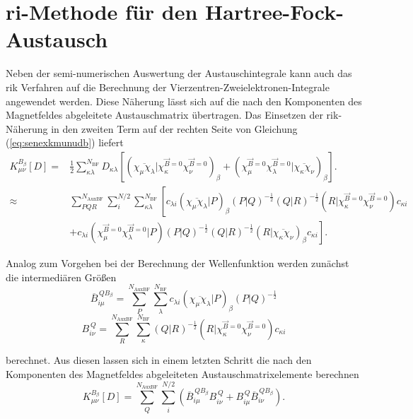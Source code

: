 \section{\acs{ri}-Methode für den Hartree-Fock-Austausch}
Neben der semi-numerischen Auswertung der Austauschintegrale kann auch das \ac{rik} Verfahren auf die Berechnung der Vierzentren-Zweielektronen-Integrale angewendet werden.\supercite{weigend2002fully} Diese Näherung lässt sich auf die nach den Komponenten des Magnetfeldes abgeleitete Austauschmatrix übertragen. Das Einsetzen der \ac{rik}-Näherung in den zweiten Term auf der rechten Seite von Gleichung (\ref{eq:senexkmunudb}) liefert
\begin{equation}
\begin{aligned}
K_{\mu\nu}^{B_\beta}[D]=&\frac{1}{2}\sum_{\kappa\lambda}^{N_{\textrm{BF}}}D_{\kappa\lambda} \left[\left(\overline{\chi_\mu\chi_\lambda}\vert\chi_\kappa^{\vec{B}=0}\chi_\nu^{\vec{B}=0}\right)_\beta+\left(\chi_\mu^{\vec{B}=0}\chi_\lambda^{\vec{B}=0}\vert\overline{\chi_\kappa\chi_\nu}\right)_\beta\right].\\
\approx& \sum_{PQR}^{N_{\text{AuxBF}}}\sum_i^{N/2}\sum_{\kappa\lambda}^{N_{\textrm{BF}}}\left[ c_{\lambda i} \left(\overline{\chi_\mu\chi_\lambda}\vert P\right)_\beta\left(P\vert Q\right)^{-\frac{1}{2}} \left(Q\vert R\right)^{-\frac{1}{2}} \left(R \vert\chi_\kappa^{\vec{B}=0}\chi_\nu^{\vec{B}=0}\right)c_{\kappa i} \right.\\
&\left.+c_{\lambda i}\left(\chi_\mu^{\vec{B}=0}\chi_\lambda^{\vec{B}=0}\vert P\right)\left(P\vert Q\right)^{-\frac{1}{2}} \left(Q\vert R\right)^{-\frac{1}{2}} \left(R\vert\overline{\chi_\kappa\chi_\nu}\right)_\beta c_{\kappa i}\right].
\end{aligned}
\end{equation}

Analog zum Vorgehen bei der Berechnung der Wellenfunktion werden zunächst die intermediären Größen 
\begin{equation}
\overline{B}_{i\mu}^{\,QB_\beta}=\sum_P^{N_{\text{AuxBF}}}\sum_{\lambda}^{N_{\textrm{BF}}}c_{\lambda i} \left(\overline{\chi_\mu\chi_\lambda}\vert P\right)_\beta\left(P\vert Q\right)^{-\frac{1}{2}}
\end{equation}
\begin{equation}
B_{i\nu}^{\,Q}=\sum_R^{N_{\text{AuxBF}}}\sum_{\kappa}^{N_{\textrm{BF}}}\left(Q\vert R\right)^{-\frac{1}{2}} \left(R \vert\chi_\kappa^{\vec{B}=0}\chi_\nu^{\vec{B}=0}\right)c_{\kappa i}
\end{equation}

berechnet. Aus diesen lassen sich in einem letzten Schritt die nach den Komponenten des Magnetfeldes abgeleiteten Austauschmatrixelemente berechnen
\begin{equation}
K_{\mu\nu}^{B_\beta}[D]=\sum_Q^{N_{\text{AuxBF}}}\sum_i^{N/2}\left(\overline{B}_{i\mu}^{\,QB_\beta} B_{i\nu}^{\,Q}+B_{i\mu}^{\,Q}\overline{B}_{i\nu}^{\,QB_\beta}\right).
\end{equation}